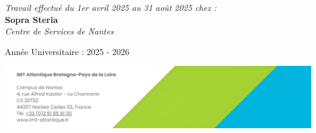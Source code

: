 \begin{titlepage}
\vspace{5mm}

\large \emph{Travail effectué du 1er avril 2025 au 31 août 2025 chez :}\\[0.5cm]
\textbf{Sopra Steria}\\
\textit{Centre de Services de Nantes}

\vfill

\begin{center}
{\large Année Universitaire : 2025 - 2026}
\end{center}

\vspace{5mm}

\begin{center}
\includegraphics[scale=0.35]{figures/IMTA_large.png}
\end{center}

\end{titlepage}